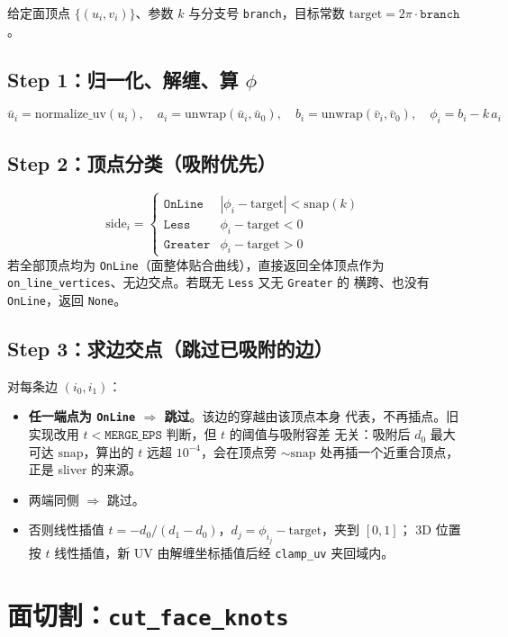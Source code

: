 \documentclass{article}
\begin{document}
给定面顶点 $\{(u_i,v_i)\}$、参数 $k$ 与分支号 \texttt{branch}，目标常数
$\mathrm{target}=2\pi\cdot\texttt{branch}$。

\subsection*{Step 1：归一化、解缠、算 $\phi$}
\[
\bar u_i=\mathrm{normalize\_uv}(u_i),\quad
a_i=\mathrm{unwrap}(\bar u_i,\bar u_0),\quad
b_i=\mathrm{unwrap}(\bar v_i,\bar v_0),\quad
\phi_i=b_i-k\,a_i
\]

\subsection*{Step 2：顶点分类（吸附优先）}
\[
\mathrm{side}_i=\begin{cases}
\texttt{OnLine} & |\phi_i-\mathrm{target}|<\mathrm{snap}(k)\\
\texttt{Less} & \phi_i-\mathrm{target}<0\\
\texttt{Greater} & \phi_i-\mathrm{target}>0
\end{cases}
\]
若全部顶点均为 \texttt{OnLine}（面整体贴合曲线），直接返回全体顶点作为
\texttt{on\_line\_vertices}、无边交点。若既无 \texttt{Less} 又无 \texttt{Greater} 的
横跨、也没有 \texttt{OnLine}，返回 \texttt{None}。

\subsection*{Step 3：求边交点（跳过已吸附的边）}

对每条边 $(i_0,i_1)$：
\begin{itemize}
\item \textbf{任一端点为 \texttt{OnLine} $\Rightarrow$ 跳过}。该边的穿越由该顶点本身
  代表，不再插点。旧实现改用 $t<\mathtt{MERGE\_EPS}$ 判断，但 $t$ 的阈值与吸附容差
  无关：吸附后 $d_0$ 最大可达 $\mathrm{snap}$，算出的 $t$ 远超 $10^{-4}$，会在顶点旁
  $\sim\mathrm{snap}$ 处再插一个近重合顶点，正是 sliver 的来源。
\item 两端同侧 $\Rightarrow$ 跳过。
\item 否则线性插值
  $t=-d_0/(d_1-d_0)$，$d_j=\phi_{i_j}-\mathrm{target}$，夹到 $[0,1]$；
  3D 位置按 $t$ 线性插值，新 UV 由解缠坐标插值后经 \texttt{clamp\_uv} 夹回域内。
\end{itemize}

\section{面切割：\texttt{cut\_face\_knots}}
\end{document}
